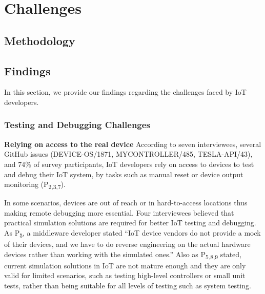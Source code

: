 
\chapter{Challenges}
\label{ch:Challenges}

\section{Methodology}


\section{Findings}
In this section, we provide our findings regarding the challenges faced by IoT developers.

\subsection{Testing and Debugging Challenges}
\textbf{Relying on access to the real device}
According to seven interviewees, several GitHub issues (DEVICE-OS/1871, MYCONTROLLER/485, TESLA-API/43), and 74\% of survey participants, IoT developers rely on access to devices to test and debug their IoT system, by tasks such as manual reset or device output monitoring (P\textsubscript{2,3,7}).


In some scenarios, devices are out of reach or in hard-to-access locations thus making remote debugging more essential. 
Four interviewees believed that practical simulation solutions are required for better IoT testing and debugging. As P\textsubscript{5}, a middleware developer stated \enquote{IoT device vendors do not provide a mock of their devices, and we have to do reverse engineering on the actual hardware devices rather than working with the simulated ones.} Also as P\textsubscript{5,8,9} stated, current simulation solutions in IoT are not mature enough and they are only valid for limited scenarios, such as testing high-level controllers or small unit tests, rather than being suitable for all levels of testing such as system testing.

